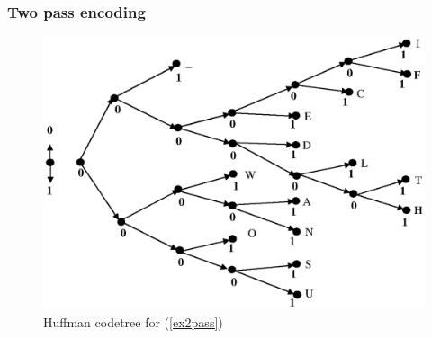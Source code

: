 \documentclass[14pt]{beamer}
\begin{document}
\begin{frame}
\frametitle{Two pass encoding}
\begin{itemize}    

    \begin{figure}[ht]
    \begin{minipage}{1.0\linewidth}
    \includegraphics[width=1.0\textwidth]{fig3_1.eps}
    \caption{Huffman codetree for (\ref{ex2pass})}
    \label{HUF_tree}
    \end{minipage}
    \end{figure}
    
\end{itemize}
\end{frame}
\end{document}

